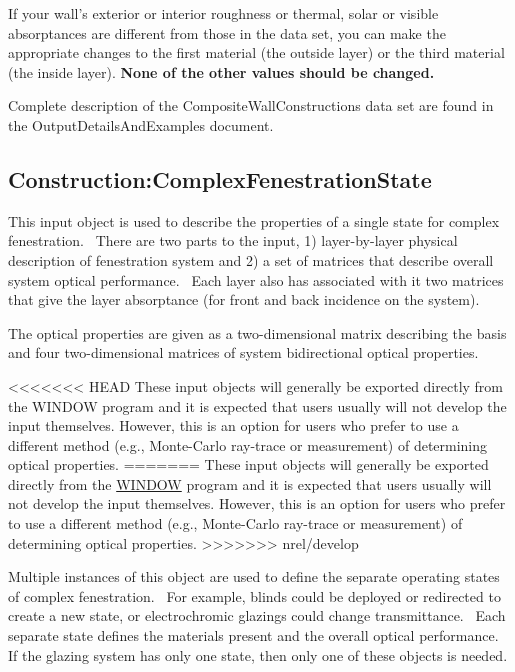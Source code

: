 If your wall's exterior or interior roughness or thermal, solar or visible absorptances are different from those in the data set, you can make the appropriate changes to the first material (the outside layer) or the third material (the inside layer). \textbf{None of the other values should be changed.}

\begin{callout}
Complete description of the CompositeWallConstructions data set are found in the OutputDetailsAndExamples document.
\end{callout}

\subsection{Construction:ComplexFenestrationState}\label{constructioncomplexfenestrationstate}

This input object is used to describe the properties of a single state for complex fenestration.~ There are two parts to the input, 1) layer-by-layer physical description of fenestration system and 2) a set of matrices that describe overall system optical performance.~ Each layer also has associated with it two matrices that give the layer absorptance (for front and back incidence on the system).

The optical properties are given as a two-dimensional matrix describing the basis and four two-dimensional matrices of system bidirectional optical properties.

<<<<<<< HEAD
These input objects will generally be exported directly from the WINDOW program and it is expected that users usually will not develop the input themselves. However, this is an option for users who prefer to use a different method (e.g., Monte-Carlo ray-trace or measurement) of determining optical properties.
=======
These input objects will generally be exported directly from the \href{https://windows.lbl.gov/software-tools#window-heading}{WINDOW} program and it is expected that users usually will not develop the input themselves. However, this is an option for users who prefer to use a different method (e.g., Monte-Carlo ray-trace or measurement) of determining optical properties.
>>>>>>> nrel/develop

Multiple instances of this object are used to define the separate operating states of complex fenestration.~ For example, blinds could be deployed or redirected to create a new state, or electrochromic glazings could change transmittance.~ Each separate state defines the materials present and the overall optical performance.~ If the glazing system has only one state, then only one of these objects is needed.

